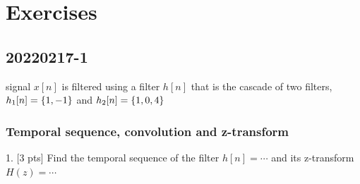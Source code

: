 
\section{Exercises}

\subsection{20220217-1}
    signal $x[n]$ is filtered using a filter $h[n]$ that is the cascade of two filters, $h_1[n]=\{{1,-1}\}$ and $h_2[n]=\{{1,0,4}\}$

    \subsubsection{Temporal sequence, convolution and z-transform}
    1. [3 pts] Find the temporal sequence of the filter $h[n]=\cdots$ and its z-transform $H(z)=\cdots$

